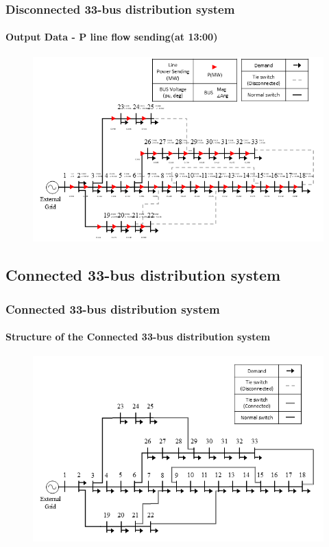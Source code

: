 \documentclass[
	11pt, %
	aspectratio=169, %
]{beamer}
\begin{document}
\begin{frame}
	\frametitle{Disconnected 33-bus distribution system}
	\framesubtitle{Output Data - P line flow sending(at 13:00)}

	\begin{figure}
		\includegraphics[width=4 in,keepaspectratio]{modified_33_bus_line_flow.png}
	\end{figure}

\end{frame}


\subsection{Connected 33-bus distribution system}

\begin{frame}
	\frametitle{Connected 33-bus distribution system}
	\framesubtitle{Structure of the Connected 33-bus distribution system}

	\begin{figure}
		\includegraphics[width=4 in,keepaspectratio]{modified_33_bus_c.png}
	\end{figure}

	
\end{frame}
\end{document}

